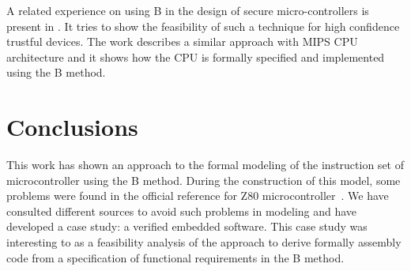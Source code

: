 \documentclass[a4paper]{llncs}
\begin{document}
A related experience on using B in the design of secure
micro-controllers is present in \cite{Marc20113}. It tries to show the
feasibility of such a technique for high confidence trustful
devices. The work \cite{Subotic2010} describes a similar approach with
MIPS CPU architecture and it shows how the CPU is formally specified
and implemented using the B method.

% 
%
%
%


 
\section{Conclusions}
\label{sec:conclusions} 

This work has shown an approach to the formal modeling of the
instruction set of microcontroller using the B method.  During the
construction of this model, some problems were found in the official
reference for Z80 microcontroller~\cite{Z80_manual}. We have consulted
different sources \cite{Simulator_z80,UndocumentedZ80,Z80_manual} to
avoid such problems in modeling and have developed a case study: a
verified embedded software.  This case study was interesting to as a
feasibility analysis of the approach to derive formally assembly code
from a specification of functional requirements in the B method.

\end{document}
